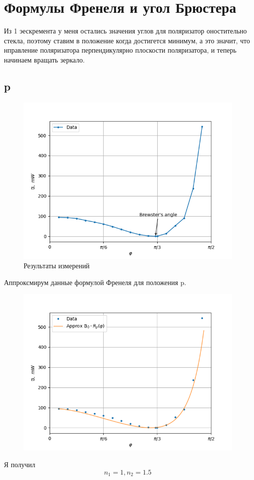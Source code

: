 \section{Формулы Френеля и угол Брюстера}

Из 1 эескремента у меня остались значения углов для 
поляризатор оностительно стекла, поэтому ставим в положение когда достигется 
минимум, а это значит, что нправление поляризатора перпендикулярно плоскости поляризатора,
и теперь начинаем вращать зеркало. 
\subsection{p}
\begin{figure}[h]
    \centering
    \includegraphics[trim={0 0 0 0},clip,width=\textwidth]{Ex_2/Task_2_1_1.png}
     \caption{Результаты измерений}
    \label{Task_2_1_1}
\end{figure}

Аппроксмирум данные формулой Френеля для положения p.
\begin{figure}[h]
    \centering
    \includegraphics[trim={0 0 0 0},clip,width=\textwidth]{Ex_2/Task_2_1_2.png}
     \caption{}
    \label{Task_2_1_2}
\end{figure}
Я получил $$ n_1 = 1, n_2 = 1.5 $$

